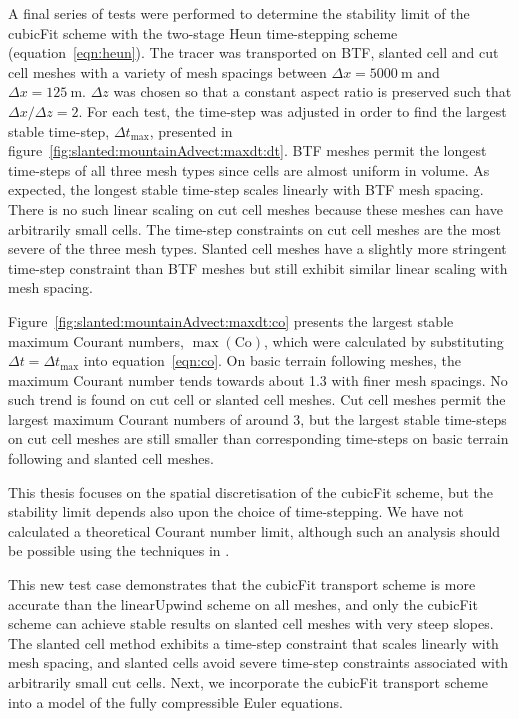 A final series of tests were performed to determine the stability limit of the cubicFit scheme with the two-stage Heun time-stepping scheme (equation~\ref{eqn:heun}).
The tracer was transported on BTF, slanted cell and cut cell meshes with a variety of mesh spacings between $\Delta x = \SI{5000}{\meter}$ and $\Delta x = \SI{125}{\meter}$.  $\Delta z$ was chosen so that a constant aspect ratio is preserved such that $\Delta x / \Delta z = 2$.
For each test, the time-step was adjusted in order to find the largest stable time-step, $\Delta t_\mathrm{max}$, presented in figure~\ref{fig:slanted:mountainAdvect:maxdt:dt}.
BTF meshes permit the longest time-steps of all three mesh types since cells are almost uniform in volume.  As expected, the longest stable time-step scales linearly with BTF mesh spacing.
There is no such linear scaling on cut cell meshes because these meshes can have arbitrarily small cells.  The time-step constraints on cut cell meshes are the most severe of the three mesh types.  Slanted cell meshes have a slightly more stringent time-step constraint than BTF meshes but still exhibit similar linear scaling with mesh spacing.

Figure~\ref{fig:slanted:mountainAdvect:maxdt:co} presents the largest stable maximum Courant numbers, $\max(\mathrm{Co})$, which were calculated by substituting $\Delta t = \Delta t_\mathrm{max}$ into equation~\eqref{eqn:co}.
On basic terrain following meshes, the maximum Courant number tends towards about \num{1.3} with finer mesh spacings.
No such trend is found on cut cell or slanted cell meshes.
Cut cell meshes permit the largest maximum Courant numbers of around \num{3}, but the largest stable time-steps on cut cell meshes are still smaller than corresponding time-steps on basic terrain following and slanted cell meshes.

This thesis focuses on the spatial discretisation of the cubicFit scheme, but the stability limit depends also upon the choice of time-stepping.  We have not calculated a theoretical Courant number limit, although such an analysis should be possible using the techniques in \citep{baldauf2008}.

This new test case demonstrates that the cubicFit transport scheme is more accurate than the linearUpwind scheme on all meshes, and only the cubicFit scheme can achieve stable results on slanted cell meshes with very steep slopes.
The slanted cell method exhibits a time-step constraint that scales linearly with mesh spacing, and slanted cells avoid severe time-step constraints associated with arbitrarily small cut cells.
Next, we incorporate the cubicFit transport scheme into a model of the fully compressible Euler equations.
